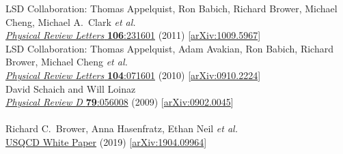 \begin{spacelist}
\begin{revnumerate}
      LSD Collaboration: Thomas Appelquist, Ron Babich, Richard Brower, Michael Cheng, Michael A.~Clark \textit{et al.} \\ %
      \href{http://dx.doi.org/10.1103/PhysRevLett.106.231601}{\textit{Physical Review Letters} \textbf{106}:231601} (2011) [\href{http://arxiv.org/abs/1009.5967}{arXiv:1009.5967}]
    \pagebreakitem
       \\
      LSD Collaboration: Thomas Appelquist, Adam Avakian, Ron Babich, Richard Brower, Michael Cheng \textit{et al.} \\ %
      \href{http://dx.doi.org/10.1103/PhysRevLett.104.071601}{\textit{Physical Review Letters} \textbf{104}:071601} (2010) [\href{http://arxiv.org/abs/0910.2224}{arXiv:0910.2224}]
    \pagebreakitem
       \\
      David Schaich and Will Loinaz \\
      \href{http://dx.doi.org/10.1103/PhysRevD.79.056008}{\textit{Physical Review D} \textbf{79}:056008} (2009) [\href{http://arxiv.org/abs/0902.0045}{arXiv:0902.0045}] \\
%
%
%
\vspace{18 pt} \hspace{-22 pt}{\large \bfseries Other articles, theses \& white papers} \vspace{-8 pt}
    \pagebreakitem
       \\
      Richard C.~Brower, Anna Hasenfratz, Ethan Neil \textit{et al.} \\ %
      \href{http://home.fnal.gov/~ask/USQCD/members/WP/BSMwhitepaper2018.pdf}{USQCD White Paper} (2019) [\href{http://arxiv.org/abs/1904.09964}{arXiv:1904.09964}] \\

\end{revnumerate}
\end{spacelist}
